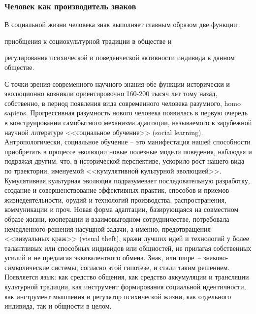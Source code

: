 \subsubsection{Человек как производитель знаков}
\label{2.1}
В социальной жизни человека знак выполняет главным образом две
функции:
\begin{enumerate*}[label=\asbuk*)]
    \item приобщения к социокультурной традиции в обществе и
    \item регулирования психической и поведенческой активности индивида в
данном обществе.
\end{enumerate*}
С точки зрения современного научного знания обе
функции исторически и эволюционно возникли ориентировочно 160-200
тысяч лет тому назад, собственно, в период появления вида современного
человека разумного, homo sapiens.\autocite{pagel2012wired} Прогрессивная
разумность нового человека появилась в первую очередь в
конструировании самобытного механизма адаптации, называемого в
зарубежной научной литературе <<социальное обучение>>
(social learning).\autocite{ormrod1999human}\autocite{miller2010theories}\autocite{online:sociallearning}
Антропологически, социальное обучение -- это манифестация
нашей способности приобретать в процессе эволюции новые полезные
модели поведения, наблюдая и подражая другим, что, в исторической
перспективе, ускорило рост нашего вида по траектории, именуемой
<<кумулятивной культурной эволюцией>>. Кумулятивная культурная
эволюция подразумевает последовательную разработку, создание и
совершенствование эффективных практик, способов и приемов
жизнедеятельности, орудий и технологий производства, распространения,
коммуникации и проч. Новая форма адаптации, базирующаяся на
совместном образе жизни, кооперации и взаимовыгодном сотрудничестве,
потребовала немедленного решения насущной задачи, а именно,
предотвращения <<визуальных краж>> (visual theft), кражи лучших идей и
технологий у более талантливых или способных индивидов или общностей,
не прилагая собственных усилий и не предлагая эквивалентного обмена.\autocite{pagel2012wired}
Знак, или шире~-- знаково-символические системы, согласно этой
гипотезе, и стали таким решением. Появляется язык: как средство общения,
как средство аккумуляции и трансляции культурной традиции, как
инструмент формирования социальной идентичности, как инструмент
мышления и регулятор психической жизни, как отдельного индивида, так и
общности в целом.

